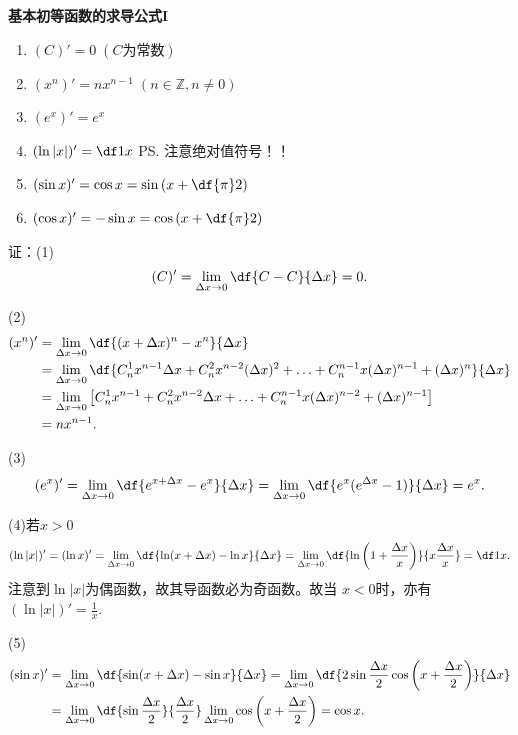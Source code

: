 \begin{thx}
	{\bf 基本初等函数的求导公式I}
	\begin{enumerate}[(1)]
	  \item $(C)'=0\;(C\mbox{为常数})$ 
	  \item $(x^n)'=nx^{n-1}\;(n\in\mathbb{Z},n\ne
	  0)$ 
	  \item $(e^x)'=e^x$ 
	  \item $(\ln|x|)'=\df1x$ \ps{注意绝对值符号！！}
	  \item $(\sin x)'=\cos x=\sin\left(x+\df{\pi}2\right)$
	  \item $(\cos x)'=-\sin x=\cos\left(x+\df{\pi}2\right)$
	\end{enumerate}
\end{thx}

证：(1)
\begin{align*}
	(C)'=\lim\limits_{\Delta x\to0}\df{C-C}{\Delta x}=0.
\end{align*}

(2)
\begin{align*}
	(x^n)'
	&=\lim\limits_{\Delta x\to0}\df{(x+\Delta x)^n-x^n}{\Delta x}\\
	&=\lim\limits_{\Delta x\to0}
	\df{C_n^1x^{n-1}\Delta x+C_n^2x^{n-2}(\Delta x)^2+\ldots
	+C_{n}^{n-1}x(\Delta x)^{n-1}+(\Delta x)^n}{\Delta x}\\
	&=\lim\limits_{\Delta x\to0}\left[C_n^1x^{n-1}
	+C_n^2x^{n-2}\Delta x+\ldots
	+C_{n}^{n-1}x(\Delta x)^{n-2}+(\Delta x)^{n-1}\right]\\
	&=nx^{n-1}.
\end{align*}

(3)
\begin{align*}
	(e^x)'=\lim\limits_{\Delta x\to0}
	\df{e^{x+\Delta x}-e^x}{\Delta x}
	=\lim\limits_{\Delta x\to0}\df{e^x(e^{\Delta x}-1)}{\Delta x}
	=e^x.
\end{align*}

(4)若$x>0$
\begin{align*}
	(\ln |x|)'=(\ln x)'=\lim\limits_{\Delta x\to0}
	\df{\ln(x+\Delta x)-\ln x}{\Delta x}
	=\lim\limits_{\Delta x\to0}
	\df{\ln\left(1+\frac{\Delta x}x\right)}{x\frac{\Delta x}x}
	=\df1x.
\end{align*}
注意到$\ln|x|$为偶函数，故其导函数必为奇函数。故当
$x<0$时，亦有$(\ln|x|)'=\frac 1x$.

(5)
\begin{align*}
	(\sin x)'
	&=\lim\limits_{\Delta x\to0}
	\df{\sin(x+\Delta x)-\sin x}{\Delta x}
	=\lim\limits_{\Delta x\to0}
	\df{2\sin\frac{\Delta x}2\cos\left(x+\frac{\Delta x}2\right)}{\Delta x}\\
	&=\lim\limits_{\Delta x\to0}
	\df{\sin\frac{\Delta x}2}{\frac{\Delta x}2}
	\lim\limits_{\Delta x\to0}
	\cos\left(x+\frac{\Delta x}2\right)
	=\cos x.
\end{align*}

